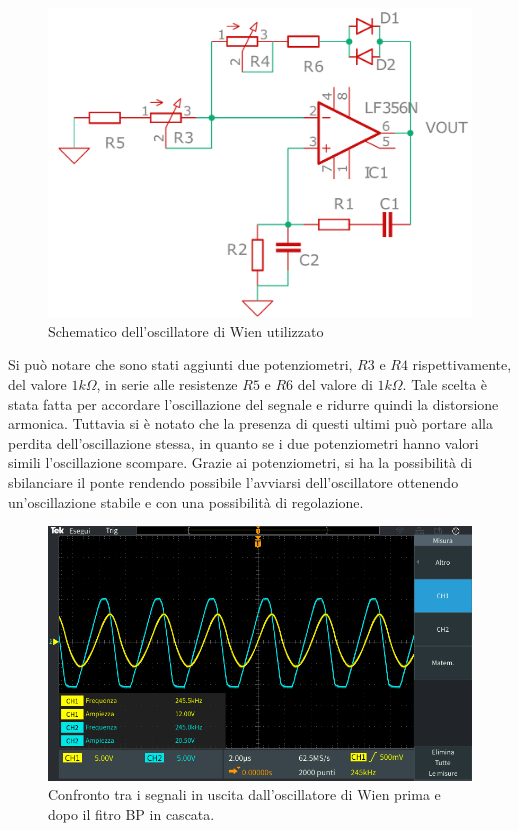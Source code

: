 \documentclass[titlepage]{report}
\begin{document}
\begin{figure}[H]
	\centering
	\includegraphics[scale=0.5]{Immagini/sch_osc_wien_cad.pdf}
	\caption{Schematico dell'oscillatore di Wien utilizzato}
	\label{sch:osc_wien}
\end{figure}

Si può notare che sono stati aggiunti due potenziometri, $R3$ e $R4$ rispettivamente, del valore  $1k\Omega$,  in serie alle resistenze $R5$ e $R6$ del valore di  $1k\Omega$. Tale scelta è stata fatta per accordare l'oscillazione del segnale e ridurre quindi la distorsione armonica. Tuttavia si è notato che la presenza di questi ultimi può portare alla perdita dell'oscillazione stessa, in quanto se i due potenziometri hanno valori simili l'oscillazione scompare. Grazie ai potenziometri, si ha la possibilità di sbilanciare il ponte rendendo possibile l'avviarsi dell'oscillatore ottenendo un'oscillazione stabile e con una possibilità di regolazione.

	\begin{figure}[H]
		\centering
		\includegraphics[scale=0.5]{Immagini/osc_wien+bp210k.PNG}
		\caption{Confronto tra i segnali in uscita dall'oscillatore di Wien prima e dopo il fitro BP in cascata.}
		\label{fig:SINwien+BP}
	\end{figure}
\end{document}
